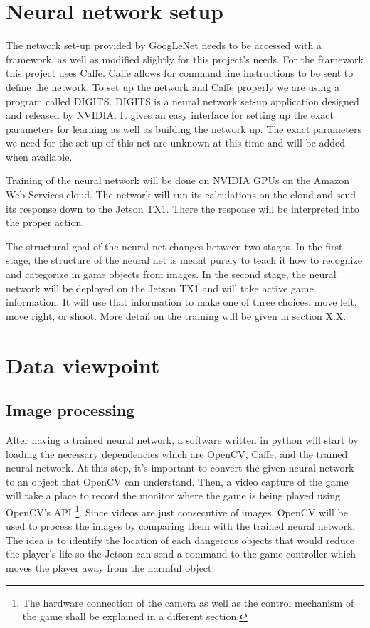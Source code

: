\documentclass{scrreprt}
\begin{document}
\section{Neural network setup}%

The network set-up provided by GoogLeNet needs to be accessed with a framework, as well as modified slightly for this project's needs.
For the framework this project uses Caffe. 
Caffe allows for command line instructions to be sent to define the network.
To set up the network and Caffe properly we are using a program called DIGITS.
DIGITS is a neural network set-up application designed and released by NVIDIA. 
It gives an easy interface for setting up the exact parameters for learning as well as building the network up.
The exact parameters we need for the set-up of this net are unknown at this time and will be added when available.

Training of the neural network will be done on NVIDIA GPUs on the Amazon Web Services cloud.
The network will run its calculations on the cloud and send its response down to the Jetson TX1.
There the response will be interpreted into the proper action.

The structural goal of the neural net changes between two stages. 
In the first stage, the structure of the neural net is meant purely to teach it how to recognize and categorize in game objects from images.
In the second stage, the neural network will be deployed on the Jetson TX1 and will take active game information.
It will use that information to make one of three choices: move left, move right, or shoot.
More detail on the training will be given in section X.X.

\section{Data viewpoint}%

\subsection{Image processing}%

After having a trained neural network, a software written in python will start by loading the necessary dependencies which are OpenCV, Caffe, and the trained neural network.
At this step, it’s important to convert the given neural network to an object that OpenCV can understand.
Then, a video capture of the game will take a place to record the monitor where the game is being played using OpenCV’s API
\footnote{The hardware connection of the camera as well as the control mechanism of the game shall be explained in a different section.}.
Since videos are just consecutive of images, OpenCV will be used to process the images by comparing them with the trained neural network.
The idea is to identify the location of each dangerous objects that would reduce the player’s life so the Jetson can send a command to the game controller which moves the player away from the harmful object.
\end{document}
